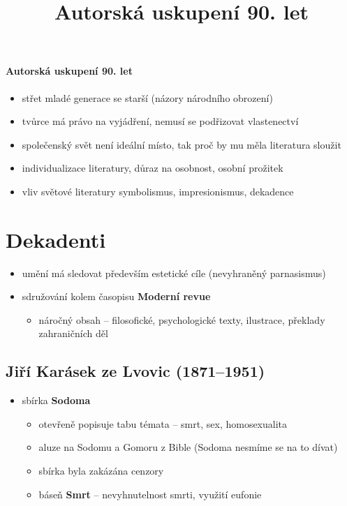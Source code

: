 \title{Autorská uskupení 90. let}


\paragraph{Autorská uskupení 90. let}
\begin{itemize}
\item střet mladé generace se starší (názory národního obrození)
\item tvůrce má právo na vyjádření, nemusí se podřizovat vlastenectví
\item společenský svět není ideální místo, tak proč by mu měla literatura sloužit
\item[\ra] individualizace literatury, důraz na osobnost, osobní prožitek 
\item vliv světové literatury \ra symbolismus, impresionismus, dekadence
\end{itemize}

\section{Dekadenti}
\begin{itemize}
\item umění má sledovat především estetické cíle (nevyhraněný parnasismus)
\item sdružování kolem časopisu \textbf{Moderní revue}
	\begin{itemize}
	\item náročný obsah -- filosofické, psychologické texty, ilustrace, překlady zahraničních děl
	\end{itemize}

\end{itemize}

\subsection{Jiří Karásek ze Lvovic (1871--1951)}
\begin{itemize}
\item sbírka \textbf{Sodoma}
	\begin{itemize}
	\item otevřeně popisuje tabu témata -- smrt, sex, homosexualita
	\item aluze na Sodomu a Gomoru z Bible (Sodoma \ra nesmíme se na to dívat)
	\item sbírka byla zakázána cenzory
	\item báseň \textbf{Smrt} -- nevyhnutelnost smrti, využití eufonie
	\end{itemize}
\end{itemize}


